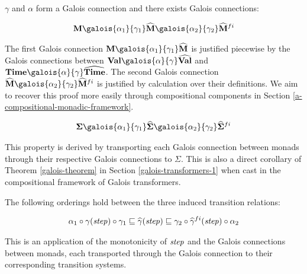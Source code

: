 \begin{proposition} $ \gamma $ and $ \alpha $ form a Galois connection
and there exists Galois connections:

\small\begin{alignat*}{1}
 \Concrete{\litM}   \galois{\alpha_1}{\gamma_1}   \Abstract{\litM}   \galois{\alpha_2}{\gamma_2}   \Abstract{\litM} ^{  fi } 
\end{alignat*}\normalsize

\end{proposition} The first Galois connection
$ \Concrete{\litM}   \galois{\alpha_1}{\gamma_1}   \Abstract{\litM} $ is
justified piecewise by the Galois connections between
$ \Concrete{\litVal}   \galois{\alpha}{\gamma}   \Abstract{\litVal} $
and
$ \Concrete{\litTime}   \galois{\alpha}{\gamma}   \Abstract{\litTime} $.
The second Galois connection
$ \Abstract{\litM}   \galois{\alpha_2}{\gamma_2}   \Abstract{\litM} ^{  fi } $
is justified by calculation over their definitions. We aim to recover
this proof more easily through compositional components in Section
\ref{a-compositional-monadic-framework}. \begin{corollary}

\small\begin{alignat*}{1}
 \Concrete{\Sigma}   \galois{\alpha_1}{\gamma_1}   \Abstract{\Sigma}   \galois{\alpha_2}{\gamma_2}   \Abstract{\Sigma}  ^{ fi } 
\end{alignat*}\normalsize

\end{corollary} This property is derived by transporting each Galois
connection between monads through their respective Galois connections to
$ \Sigma $. This is also a direct corollary of Theorem
\ref{galois-theorem} in Section \ref{galois-transformers-1} when cast in
the compositional framework of Galois transformers. \begin{proposition}
The following orderings hold between the three induced transition
relations:

\small\begin{alignat*}{1}
 \alpha  _1   \circ   \mathtt{\mathbf{\gamma}}  (\operatorname{\mathit{step}})   \circ   \gamma  _1   \sqsubseteq   \widehat{\mathtt{\mathbf{\gamma}}}  (\operatorname{\mathit{step}})   \sqsubseteq   \gamma  _2   \circ   \widehat{\mathtt{\mathbf{\gamma}}}  ^{ fi }  (\operatorname{\mathit{step}})   \circ   \alpha  _2 
\end{alignat*}\normalsize

\end{proposition} This is an application of the monotonicity of
$ \operatorname{\mathit{step}} $ and the Galois connections between monads, each
transported through the Galois connection to their corresponding
transition systems.

